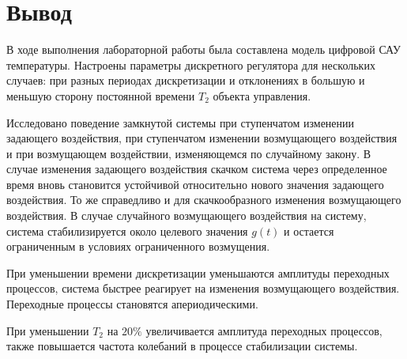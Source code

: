 \chapter{Вывод}
\label{ch:chap6}

В ходе выполнения лабораторной работы была составлена модель цифровой САУ температуры. Настроены параметры дискретного регулятора для нескольких случаев: при разных периодах дискретизации и отклонениях в большую и меньшую сторону постоянной времени $T_2$ объекта управления. 

Исследовано поведение замкнутой системы при ступенчатом изменении задающего воздействия, при ступенчатом изменении возмущающего воздействия и при возмущающем воздействии, изменяющемся по случайному закону. В случае изменения задающего воздействия скачком система через определенное время вновь становится устойчивой относительно нового значения задающего воздействия. То же справедливо и для скачкообразного изменения возмущающего воздействия. В случае случайного возмущающего воздействия на систему, система стабилизируется около целевого значения $g(t)$ и остается ограниченным в условиях ограниченного возмущения.

При уменьшении времени дискретизации уменьшаются амплитуды переходных процессов, система быстрее реагирует на изменения возмущающего воздействия. Переходные процессы становятся апериодическими.

При уменьшении $T_2$ на $20 \%$ увеличивается амплитуда переходных процессов, также повышается частота колебаний в процессе стабилизации системы.

\endinput